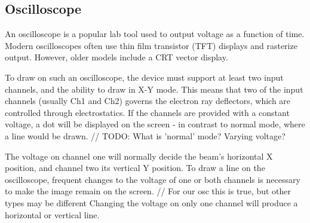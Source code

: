 \subsection{Oscilloscope}
An oscilloscope is a popular lab tool used to output voltage as a function of time.
Modern oscilloscopes often use thin film transistor (TFT) displays and rasterize output. 
However, older models include a CRT vector display.

To draw on such an oscilloscope, the device must support at least two input channels, and the ability to draw in X-Y mode.
This means that two of the input channels (usually Ch1 and Ch2) governs the electron ray deflectors, which are controlled through electrostatics.
If the channels are provided with a constant voltage, a dot will be displayed on the screen - in contrast to normal mode, where a line would be drawn. // TODO: What is 'normal' mode? Varying voltage?

The voltage on channel one will normally decide the beam's horizontal X position, and channel two its vertical Y position.
To draw a line on the oscilloscope, frequent changes to the voltage of one or both channels is necessary to make the image remain on the screen. // For our osc this is true, but other types may be different
Changing the voltage on only one channel will produce a horizontal or vertical line.
